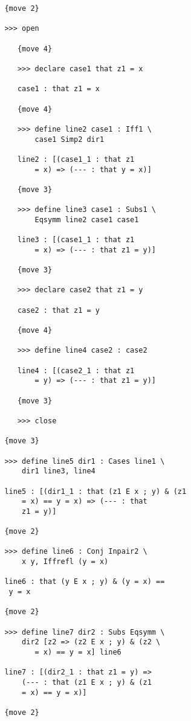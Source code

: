 \documentclass[12pt]{article}
\begin{document}
\begin{verbatim}
         {move 2}

         >>> open

            {move 4}

            >>> declare case1 that z1 = x

            case1 : that z1 = x

            {move 4}

            >>> define line2 case1 : Iff1 \
                case1 Simp2 dir1

            line2 : [(case1_1 : that z1 
                = x) => (--- : that y = x)]

            {move 3}

            >>> define line3 case1 : Subs1 \
                Eqsymm line2 case1 case1

            line3 : [(case1_1 : that z1 
                = x) => (--- : that z1 = y)]

            {move 3}

            >>> declare case2 that z1 = y

            case2 : that z1 = y

            {move 4}

            >>> define line4 case2 : case2

            line4 : [(case2_1 : that z1 
                = y) => (--- : that z1 = y)]

            {move 3}

            >>> close

         {move 3}

         >>> define line5 dir1 : Cases line1 \
             dir1 line3, line4

         line5 : [(dir1_1 : that (z1 E x ; y) & (z1 
             = x) == y = x) => (--- : that 
             z1 = y)]

         {move 2}

         >>> define line6 : Conj Inpair2 \
             x y, Iffrefl (y = x)

         line6 : that (y E x ; y) & (y = x) == 
          y = x

         {move 2}

         >>> define line7 dir2 : Subs Eqsymm \
             dir2 [z2 => (z2 E x ; y) & (z2 \
                = x) == y = x] line6

         line7 : [(dir2_1 : that z1 = y) => 
             (--- : that (z1 E x ; y) & (z1 
             = x) == y = x)]

         {move 2}


\end{verbatim}
\end{document}
